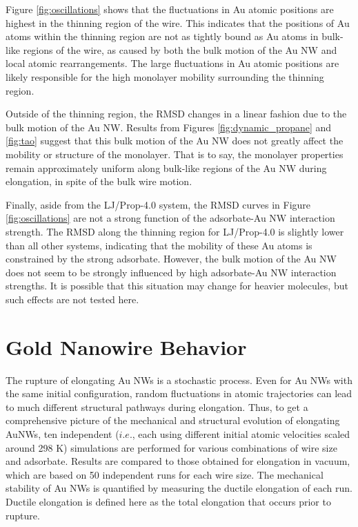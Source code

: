 \documentclass[10pt]{report}  %
\newcommand\findent{\hspace*{\parindent}}
\begin{document}
Figure \ref{fig:oscillations} shows that the fluctuations in Au atomic positions are highest in the thinning region of the wire.  This indicates that the positions of Au atoms within the thinning region are not as tightly bound as Au atoms in bulk-like regions of the wire, as caused by both the bulk motion of the Au NW and local atomic rearrangements.  The large fluctuations in Au atomic positions are likely responsible for the high monolayer mobility surrounding the thinning region.

Outside of the thinning region, the RMSD changes in a linear fashion due to the bulk motion of the Au NW.  Results from Figures \ref{fig:dynamic_propane} and \ref{fig:tao} suggest that this bulk motion of the Au NW does not greatly affect the mobility or structure of the monolayer.  That is to say, the monolayer properties remain approximately uniform along bulk-like regions of the Au NW during elongation, in spite of the bulk wire motion.    

Finally, aside from the LJ/Prop-4.0 system, the RMSD curves in Figure \ref{fig:oscillations} are not a strong function of the adsorbate-Au NW interaction strength. The RMSD along the thinning region for LJ/Prop-4.0 is slightly lower than all other systems, indicating that the mobility of these Au atoms is constrained by the strong adsorbate.  However, the bulk motion of the Au NW does not seem to be strongly influenced by high adsorbate-Au NW interaction strengths.  It is possible that this situation may change for heavier molecules, but such effects are not tested here.                         

\section{Gold Nanowire Behavior}

\findent The rupture of elongating Au NWs is a stochastic process.  Even for Au NWs with the same initial configuration, random fluctuations in atomic trajectories can lead to much different structural pathways during elongation.  Thus, to get a comprehensive picture of the mechanical and structural evolution of elongating AuNWs, ten independent ($i.e.$, each using different initial atomic velocities scaled around 298 K) simulations are performed for various combinations of wire size and adsorbate.  Results are compared to those obtained for elongation in vacuum, which are based on 50 independent runs for each wire size.  The mechanical stability of Au NWs is quantified by measuring the ductile elongation of each run. Ductile elongation is defined here as the total elongation that occurs prior to rupture.  
\end{document}
